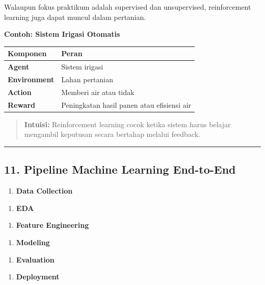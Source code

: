 \documentclass[12pt,a4paper]{article}
\begin{document}
Walaupun fokus praktikum adalah supervised dan unsupervised, reinforcement learning juga dapat muncul dalam pertanian.


\textbf{Contoh: Sistem Irigasi Otomatis}


\begin{tabular}{|l|l|}
\hline
Komponen & Peran \\
\hline
\textbf{Agent} & Sistem irigasi \\
\hline
\textbf{Environment} & Lahan pertanian \\
\hline
\textbf{Action} & Memberi air atau tidak \\
\hline
\textbf{Reward} & Peningkatan hasil panen atau efisiensi air \\
\hline
\end{tabular}


\begin{quote}
\textbf{Intuisi:} Reinforcement learning cocok ketika sistem harus belajar mengambil keputusan secara bertahap melalui feedback.\end{quote}


\hrule


\subsection{11. Pipeline Machine Learning End-to-End}


\begin{enumerate}
\item \textbf{Data Collection}
\end{enumerate}


\begin{enumerate}
\item \textbf{EDA}
\end{enumerate}


\begin{enumerate}
\item \textbf{Feature Engineering}
\end{enumerate}


\begin{enumerate}
\item \textbf{Modeling}
\end{enumerate}


\begin{enumerate}
\item \textbf{Evaluation}
\end{enumerate}


\begin{enumerate}
\item \textbf{Deployment}
\end{enumerate}
\end{document}
